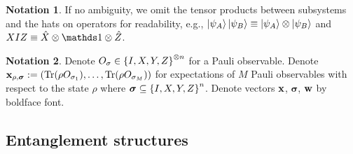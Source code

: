 \documentclass[
aps,
pra,
twocolumn,
floatfix,
]{revtex4-2}
\theoremstyle{plain}
\theoremstyle{definition}
\newtheorem{notation}{Notation}
\newcommand{\pob}{O}
\newcommand{\dm}{\rho}
\newcommand{\px}{X}
\newcommand{\pz}{Z}
\newcommand{\bmsigma}{\bm{\sigma}}
\begin{document}

\begin{notation}
	If no ambiguity,
	we omit the tensor products between subsystems and the hats on operators for readability,
	e.g.,
	$\ket{\psi_A}\ket{\psi_B}\equiv \ket{\psi_A}\otimes \ket{\psi_B}$ 
	and $\px I \pz \equiv \hat{X} \otimes \identity \otimes \hat{Z}$.
\end{notation}
\begin{notation}
	Denote $\pob_{\sigma}\in \qty{I,X,Y,Z}^{\otimes n}$ for a Pauli observable.
	Denote $\vbx_{\dm,\bmsigma}:=(\Tr(\dm\pob_{\sigma_1}),\dots,\Tr(\dm\pob_{\sigma_M}))$ for expectations of $M$ Pauli observables with respect to the state $\dm$ where $\bmsigma\subseteq \qty{I,X,Y,Z}^n$.
	Denote vectors $\vb{x}$, $\bmsigma$, $\vb{w}$ by boldface font.
\end{notation}

\subsection{Entanglement structures}
\end{document}
